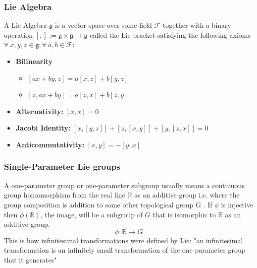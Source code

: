 \subsubsection{Lie Algebra}
A Lie Algebra $\mathfrak{g}$ is a vector space over some field $\mathcal{F}$ together with a binary operation $\left[,\right] := \mathfrak{g} \times \mathfrak{g} \rightarrow \mathfrak{g}$ called the Lie bracket satisfying the following axioms $\forall \ x, y,z \in \mathfrak{g} ; \forall \ a,b \in \mathcal{F}$:
\begin{itemize}
    \item \textbf{Bilinearity}
    \begin{itemize}
        \item $\left[ ax + by, z \right] = a\left[x,z\right] + b	\left[y,z\right]$
			\item $\left[ z, ax + by \right] = a\left[z,x\right] + b	\left[z,y\right]$
    \end{itemize}
    \item \textbf{Alternativity:} $\left[ x, x \right] = 0$	
    \item \textbf{Jacobi Identity:} $\left[ x, \left[ y,z \right] \right] + \left[ z, \left[ x, y \right] \right] + \left[ y, \left[ z,x \right] \right] = 0$
    \item \textbf{Anticommutativity:} $ \left[ x,y \right] = -\left[ y,x \right]$	
\end{itemize}

\subsubsection{Single-Parameter Lie groups}
A one-parameter group or one-parameter subgroup usually means a continuous group homomorphism from the real line $\mathbb{R}$ as an additive group i.e. where the group composition is addition to some other topological group G . If $\phi$ is injective then $\phi(\mathbb{R})$, the image, will be a subgroup of $G$ that is isomorphic to $\mathbb{R}$ as an additive group.
\begin{equation}
    \phi : \mathbb{R} \rightarrow G 
\end{equation}
This is how infinitesimal transformations were defined by Lie: "an infinitesimal transformation is an infinitely small transformation of the one-parameter group that it generates"

